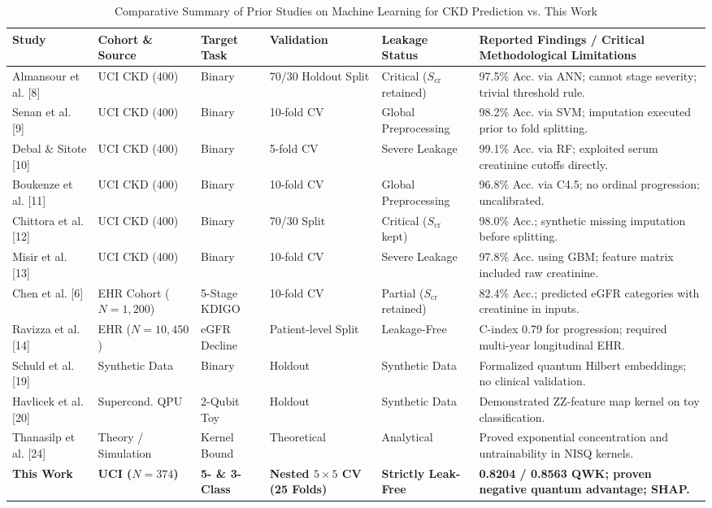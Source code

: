 \documentclass[10pt,conference]{IEEEtran}
\begin{document}
\begin{table}[t]
\centering
\caption{Comparative Summary of Prior Studies on Machine Learning for CKD Prediction vs. This Work}
\label{tab:lit_comparison}
\renewcommand{\arraystretch}{0.88}
\footnotesize
\begin{tabularx}{\textwidth}{p{2.6cm}p{2.0cm}p{1.7cm}p{2.0cm}p{2.2cm}X}
\toprule
\textbf{Study} & \textbf{Cohort \& Source} & \textbf{Target Task} & \textbf{Validation} & \textbf{Leakage Status} & \textbf{Reported Findings / Critical Methodological Limitations} \\
\midrule
Almansour et al. [8] & UCI CKD (400) & Binary & 70/30 Holdout Split & Critical ($S_{\text{cr}}$ retained) & 97.5\% Acc. via ANN; cannot stage severity; trivial threshold rule. \\
Senan et al. [9] & UCI CKD (400) & Binary & 10-fold CV & Global Preprocessing & 98.2\% Acc. via SVM; imputation executed prior to fold splitting. \\
Debal \& Sitote [10] & UCI CKD (400) & Binary & 5-fold CV & Severe Leakage & 99.1\% Acc. via RF; exploited serum creatinine cutoffs directly. \\
Boukenze et al. [11] & UCI CKD (400) & Binary & 10-fold CV & Global Preprocessing & 96.8\% Acc. via C4.5; no ordinal progression; uncalibrated. \\
Chittora et al. [12] & UCI CKD (400) & Binary & 70/30 Split & Critical ($S_{\text{cr}}$ kept) & 98.0\% Acc.; synthetic missing imputation before splitting. \\
Misir et al. [13] & UCI CKD (400) & Binary & 10-fold CV & Severe Leakage & 97.8\% Acc. using GBM; feature matrix included raw creatinine. \\
Chen et al. [6] & EHR Cohort ($N = 1,200$) & 5-Stage KDIGO & 10-fold CV & Partial ($S_{\text{cr}}$ retained) & 82.4\% Acc.; predicted eGFR categories with creatinine in inputs. \\
Ravizza et al. [14] & EHR ($N = 10,450$) & eGFR Decline & Patient-level Split & Leakage-Free & C-index 0.79 for progression; required multi-year longitudinal EHR. \\
Schuld et al. [19] & Synthetic Data & Binary & Holdout & Synthetic Data & Formalized quantum Hilbert embeddings; no clinical validation. \\
Havlicek et al. [20] & Supercond. QPU & 2-Qubit Toy & Holdout & Synthetic Data & Demonstrated ZZ-feature map kernel on toy classification. \\
Thanasilp et al. [24] & Theory / Simulation & Kernel Bound & Theoretical & Analytical & Proved exponential concentration and untrainability in NISQ kernels. \\
\textbf{This Work} & \textbf{UCI ($N = 374$)} & \textbf{5- \& 3-Class} & \textbf{Nested $5 \times 5$ CV (25 Folds)} & \textbf{Strictly Leak-Free} & \textbf{0.8204 / 0.8563 QWK; proven negative quantum advantage; SHAP.} \\
\bottomrule
\end{tabularx}
\end{table}
\end{document}
